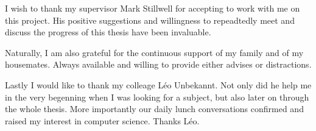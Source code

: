 I wish to thank my supervisor Mark Stillwell for accepting to work with me on
this project. His positive suggestions and willingness to repeadtedly meet and
discuss the progress of this thesis have been invaluable.

Naturally, I am also grateful for the continuous support of my family and of my
housemates. Always available and willing to provide either advises or
distractions.

Lastly I would like to thank my colleage L\'eo Unbekannt. Not only did he help
me in the very begenning when I was looking for a subject, but also later on
through the whole thesis. More importantly our daily lunch conversations
confirmed and raised my interest in computer science. Thanks L\'eo.
